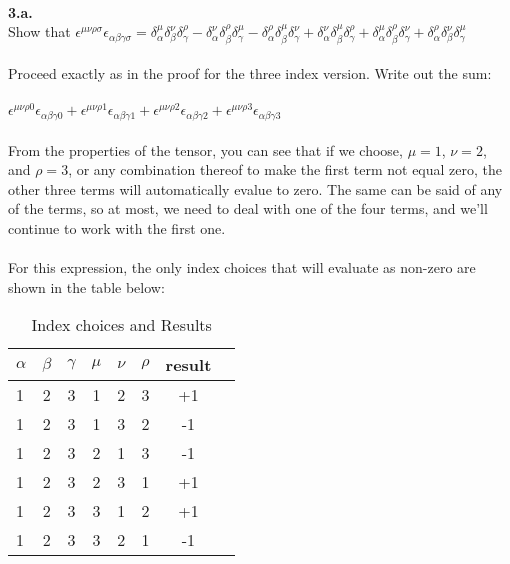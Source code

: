 \documentclass[prb,preprint]
{revtex4-1}
\newcommand{\PRLsep}{\noindent\makebox[\linewidth]{\resizebox{0.8888\linewidth}{2pt}{$\bullet$}}\bigskip}
\begin{document}
\\
\PRLsep
\newpage
\textbf{3.a.}
\\
Show that $\epsilon^{\mu\nu\rho\sigma}\epsilon_{\alpha\beta\gamma\sigma} = \delta^\mu_\alpha \delta^\nu_\beta \delta^\rho_\gamma - \delta^\nu_\alpha \delta^\rho_\beta \delta^\mu_\gamma - \delta^\rho_\alpha \delta^\mu_\beta \delta^\nu_\gamma + \delta^\nu_\alpha \delta^\mu_\beta \delta^\rho_\gamma + \delta^\mu_\alpha \delta^\rho_\beta \delta^\nu_\gamma + \delta^\rho_\alpha \delta^\nu_\beta \delta^\mu_\gamma$ 
\\
\\
Proceed exactly as in the proof for the three index version.  Write out the sum:
\\
\\
$\epsilon^{\mu\nu\rho 0}\epsilon_{\alpha\beta\gamma 0} + \epsilon^{\mu\nu\rho 1}\epsilon_{\alpha\beta\gamma 1} + \epsilon^{\mu\nu\rho 2}\epsilon_{\alpha\beta\gamma 2} + \epsilon^{\mu\nu\rho 3}\epsilon_{\alpha\beta\gamma 3}$
\\
\\
From the properties of the tensor, you can see that if we choose, $\mu = 1$, $\nu = 2$, and $\rho = 3$, or any combination thereof to make the first term not equal zero, the other three terms will automatically evalue to zero. The same can be said of any of the terms, so at most, we need to deal with one of the four terms, and we'll continue to work with the first one.
\\
\\
For this expression, the only index choices that will evaluate as non-zero are shown in the table below:
\begin{table}[h!]
\centering
\caption{Index choices and Results}
\begin{ruledtabular}
\begin{tabular}{l c c c c c c p{5cm}}
$\alpha$ & $\beta$ & $\gamma$ & $\mu$ & $\nu$ & $\rho$ & result \\
\hline	%
1 & 2 & 3 & 1 & 2 & 3 & +1 \\
1 & 2 & 3 & 1 & 3 & 2 & -1 \\
1 & 2 & 3 & 2 & 1 & 3 & -1 \\
1 & 2 & 3 & 2 & 3 & 1 & +1 \\
1 & 2 & 3 & 3 & 1 & 2 & +1 \\
1 & 2 & 3 & 3 & 2 & 1 & -1 \\
\end{tabular}
\end{ruledtabular}
\label{bosons}
\end{table}
\end{document}
